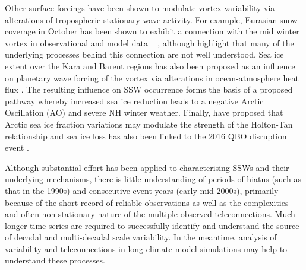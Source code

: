 \documentclass[wcd, manuscript]{copernicus}
\providecommand{\DIFadd}[1]{{\protect\color{blue}\uwave{#1}}} %
\providecommand{\DIFdel}[1]{{\protect\color{red}\sout{#1}}}                      %
\providecommand{\DIFaddbegin}{} %
\providecommand{\DIFaddend}{} %
\providecommand{\DIFdelbegin}{} %
\providecommand{\DIFdelend}{} %
\begin{document}
Other surface forcings have been shown to modulate vortex variability via alterations of tropospheric stationary wave activity. For example, Eurasian snow coverage in October has been shown to exhibit a connection with the mid winter vortex in observational and model data \DIFdelbegin \DIFdel{\mbox{%
\citep{Garfinkel2010, Cohen2007}}\hspace{0pt}%
}\DIFdelend \DIFaddbegin \DIFadd{\mbox{%
\citep{garfinkel20, Cohen2007}}\hspace{0pt}%
}\DIFaddend , although \cite{Henderson2018} highlight that many of the underlying processes behind this connection are not well understood. Sea ice extent over the Kara and Barent regions has also been proposed as an influence on planetary wave forcing of the vortex via alterations in ocean-atmosphere heat flux \citep{Kim2020, Nakamura2016}. The resulting influence on SSW occurrence forms the basis of a proposed pathway whereby increased sea ice reduction leads to a negative Arctic Oscillation (AO) and severe NH winter weather. Finally, \cite{Hirota2018} have proposed that Arctic sea ice fraction variations may modulate the strength of the Holton-Tan relationship  and sea ice loss has also been linked to the 2016 QBO disruption event \cite{labe2019}. 

Although substantial effort has been applied to characterising SSWs and their underlying mechanisms, there is little understanding of periods of hiatus (such as that in the 1990s) and consecutive-event years (early-mid 2000s), primarily because of the short record of reliable observations as well as the complexities and often non-stationary nature of the multiple observed teleconnections. Much longer time-series are required to successfully identify and understand the source of decadal and multi-decadal scale variability. In the meantime, analysis of variability and teleconnections in long climate model simulations may help to understand these processes. 
\end{document}
